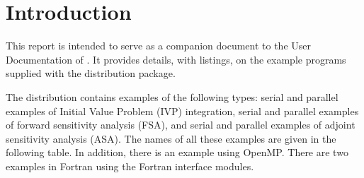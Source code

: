 \section{Introduction}\label{s:ex_intro}

This report is intended to serve as a companion document to the User
Documentation of {\cvodes} \cite{cvodes_ug}.  It provides details, with
listings, on the example programs supplied with the {\cvodes} distribution
package.

The {\cvodes} distribution contains examples of the following types: 
serial and parallel examples of Initial Value Problem (IVP) integration, 
serial and parallel examples of forward sensitivity analysis (FSA), and 
serial and parallel examples of adjoint sensitivity analysis (ASA).
The names of all these examples are given in the following table.
In addition, there is an example using OpenMP.  There are two examples
in Fortran using the {\sundials} Fortran interface modules.

\newlength{\colone}

